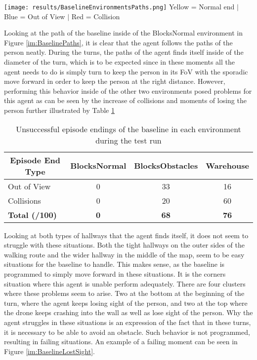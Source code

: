 \begin{Figure}
    \centering
    \texttt{[image: results/BaselineEnvironmentsPaths.png]}
    \tiny 
    Yellow = Normal end $|$ Blue = Out of View $|$ Red = Collision
    \label{im:BaselinePaths}
\end{Figure}

Looking at the path of the baseline inside of the BlocksNormal environment in 
Figure \ref{im:BaselinePaths}, 
it is clear that the agent follows the paths of the person neatly. During 
the turns, the paths of the agent finds itself inside of the diameter of the 
turn, which is to be expected since in these moments all the agent 
needs to do is simply turn to keep the person in its FoV with the sporadic 
move forward in order to keep the person at the right distance. However, performing 
this behavior inside of the other two environments posed problems for
this agent as can be seen by the increase of collisions and moments of losing 
the person further illustrated by Table \ref{tab:BaselinesEnds}

\begin{table}[h]
    \centering
    \caption{Unsuccessful episode endings of the baseline in each environment during the test run}
    \label{tab:BaselinesEnds}
    \begin{tabular}{l|c|c|c}
    \multicolumn{1}{c|}{\textbf{Episode End Type}} & \textbf{BlocksNormal} & \textbf{BlocksObstacles} & \textbf{Warehouse} \\ \hline
    Out of View           & 0          & 33          & 16          \\
    Collisions            & 0          & 20          & 60          \\ \hline
    \textbf{Total (/100)} & \textbf{0} & \textbf{68} & \textbf{76}
    \end{tabular}
\end{table}

Looking at both 
types of hallways that the agent finds itself, it does not seem to struggle with 
these situations. Both the tight hallways on the outer sides of the walking route
and the wider hallway in the middle of the map, seem to be easy situations for 
the baseline to handle. This makes sense, as the baseline is programmed to simply 
move forward in these situations. It is the corners situation 
where this agent is unable perform adequately. There 
are four clusters where these problems seem to arise. Two at the bottom at the 
beginning of the turn, where the agent keeps losing sight of the person, and two at 
the top where the drone keeps crashing into the wall as well as lose sight of the 
person. Why the agent struggles in these situations is an expression of the fact 
that in these turns, it is necessary to be able to avoid an obstacle. Such behavior 
is not programmed, resulting in failing situations. An example of a failing moment 
can be seen in Figure \ref{im:BaselineLostSight}.\newline

